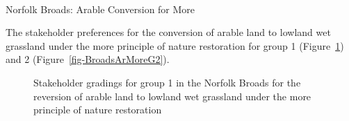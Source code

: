 \documentclass[
  12pt,
  letterpaper,
  DIV=11,
  numbers=noendperiod]{scrartcl}
\makeatletter
\let\oldparagraph\paragraph
\renewcommand{\paragraph}{
    \@ifstar
      \xxxParagraphStar
      \xxxParagraphNoStar
  }
\newcommand{\xxxParagraphStar}[1]{\oldparagraph*{#1}\mbox{}}
\newcommand{\xxxParagraphNoStar}[1]{\oldparagraph{#1}\mbox{}}
\makeatother
\begin{document}
\newpage{}

\paragraph{Norfolk Broads: Arable Conversion for
More}\label{norfolk-broads-arable-conversion-for-more}

The stakeholder preferences for the conversion of arable land to lowland
wet grassland under the more principle of nature restoration for group 1
(Figure~\ref{fig-BroadsArMoreG1}) and 2
(Figure~\ref{fig-BroadsArMoreG2}).

\begin{figure}[H]


\caption{\label{fig-BroadsArMoreG1}Stakeholder gradings for group 1 in
the Norfolk Broads for the reversion of arable land to lowland wet
grassland under the more principle of nature restoration}

\end{figure}%
\end{document}
